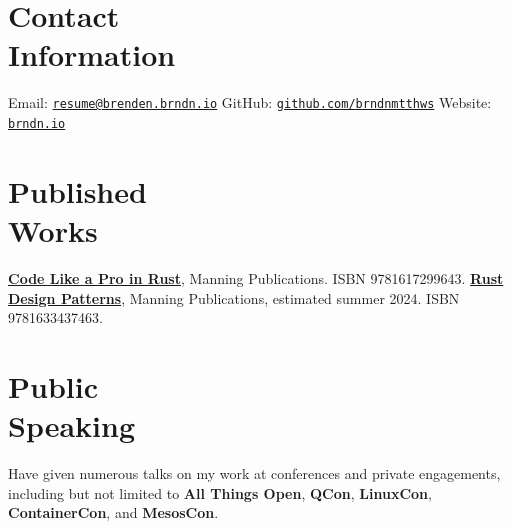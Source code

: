 \documentclass[margin,line]{resume}
\begin{document}
 
\begin{resume}

    \section{\mysidestyle Contact\\Information}

    Email: \href{mailto:resume@brenden.brndn.io}{\texttt{resume@brenden.brndn.io}} \hfill
    GitHub: \href{https://github.com/brndnmtthws}{\texttt{github.com/brndnmtthws}} \hfill
    Website: \href{https://brndn.io}{\texttt{brndn.io}} \hfill
    \vspace{3mm}

    \section{\mysidestyle Published\\Works}

    \href{https://www.manning.com/books/code-like-a-pro-in-rust}{\textbf{Code Like a Pro in Rust}}, Manning Publications. ISBN 9781617299643.
    \linebreak \href{https://www.manning.com/books/rust-design-patterns}{\textbf{Rust Design Patterns}}, Manning Publications,
    estimated summer 2024. ISBN 9781633437463.

    \vspace{3mm}

    \section{\mysidestyle Public\\Speaking}

    Have given numerous talks on my work at conferences and private engagements,
    including but not limited to \textbf{All Things Open}, \textbf{QCon},
    \textbf{LinuxCon}, \textbf{ContainerCon}, and \textbf{MesosCon}.
    
    \vspace{3mm}


\end{resume}
\end{document}
